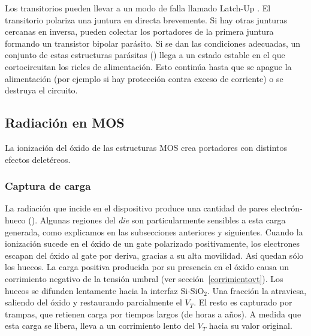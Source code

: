 Los transitorios pueden llevar a un modo de falla llamado Latch-Up
\cite{gregory_latch-up_1973}.
El transitorio polariza una juntura en directa brevemente.
Si hay otras junturas cercanas en inversa,
pueden colectar los portadores de la primera juntura 
formando un transistor bipolar parásito.
Si se dan las condiciones adecuadas,
un conjunto de estas estructuras parásitas ()
llega a un estado estable
en el que cortocircuitan los rieles de alimentación.
Esto continúa hasta que se apague la alimentación 
(por ejemplo si hay protección contra exceso de corriente)
o se destruya el circuito.
\subsection{Radiación en MOS}
La ionización del óxido de las estructuras MOS crea portadores 
con distintos efectos deletéreos. 
\subsubsection{Captura de carga}
La radiación que incide en el dispositivo 
produce una cantidad de pares electrón-hueco ().
Algunas regiones del \emph{die}
son particularmente sensibles a esta carga generada,
como explicamos en las subsecciones anteriores y siguientes.
Cuando la ionización sucede en el óxido de un gate polarizado positivamente,
los electrones escapan del óxido al gate por deriva,
gracias a su alta movilidad.
Así quedan sólo los huecos.
La carga positiva producida por su presencia en el óxido 
causa un corrimiento negativo de la tensión umbral 
(ver sección~\ref{corrimientovt}).
Los huecos se difunden lentamente hacia la interfaz Si-SiO$_2$.
Una fracción la atraviesa, 
saliendo del óxido y restaurando parcialmente el $V_T$.
El resto es capturado por trampas,
que retienen carga por tiempos largos (de horas a años).
A medida que esta carga se libera, 
lleva a un corrimiento lento del $V_T$ hacia su valor original.
